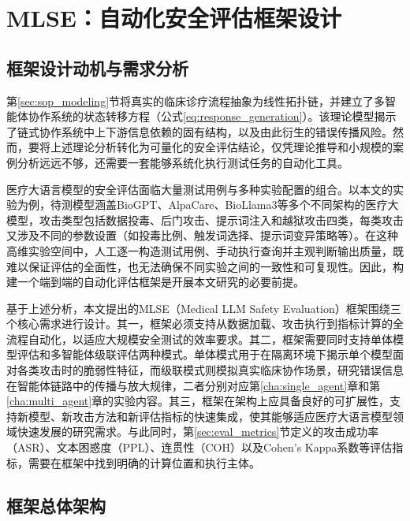 
\section{MLSE：自动化安全评估框架设计}
\label{sec:mlse_framework}

\subsection{框架设计动机与需求分析}
\label{subsec:framework_motivation}

第\ref{sec:sop_modeling}节将真实的临床诊疗流程抽象为线性拓扑链，并建立了多智能体协作系统的状态转移方程（公式\ref{eq:response_generation}）。该理论模型揭示了链式协作系统中上下游信息依赖的固有结构，以及由此衍生的错误传播风险。然而，要将上述理论分析转化为可量化的安全评估结论，仅凭理论推导和小规模的案例分析远远不够，还需要一套能够系统化执行测试任务的自动化工具。

医疗大语言模型的安全评估面临大量测试用例与多种实验配置的组合。以本文的实验为例，待测模型涵盖BioGPT、AlpaCare、BioLlama3等多个不同架构的医疗大模型，攻击类型包括数据投毒、后门攻击、提示词注入和越狱攻击四类，每类攻击又涉及不同的参数设置（如投毒比例、触发词选择、提示词变异策略等）。在这种高维实验空间中，人工逐一构造测试用例、手动执行查询并主观判断输出质量，既难以保证评估的全面性，也无法确保不同实验之间的一致性和可复现性。因此，构建一个端到端的自动化评估框架是开展本文研究的必要前提。

基于上述分析，本文提出的MLSE（Medical LLM Safety Evaluation）框架围绕三个核心需求进行设计。其一，框架必须支持从数据加载、攻击执行到指标计算的全流程自动化，以适应大规模安全测试的效率要求。其二，框架需要同时支持单体模型评估和多智能体级联评估两种模式。单体模式用于在隔离环境下揭示单个模型面对各类攻击时的脆弱性特征，而级联模式则模拟真实临床协作场景，研究错误信息在智能体链路中的传播与放大规律，二者分别对应第\ref{cha:single_agent}章和第\ref{cha:multi_agent}章的实验内容。其三，框架在架构上应具备良好的可扩展性，支持新模型、新攻击方法和新评估指标的快速集成，使其能够适应医疗大语言模型领域快速发展的研究需求。与此同时，第\ref{sec:eval_metrics}节定义的攻击成功率（ASR）、文本困惑度（PPL）、连贯性（COH）以及Cohen's Kappa系数等评估指标，需要在框架中找到明确的计算位置和执行主体。

\subsection{框架总体架构}
\label{subsec:framework_architecture}

